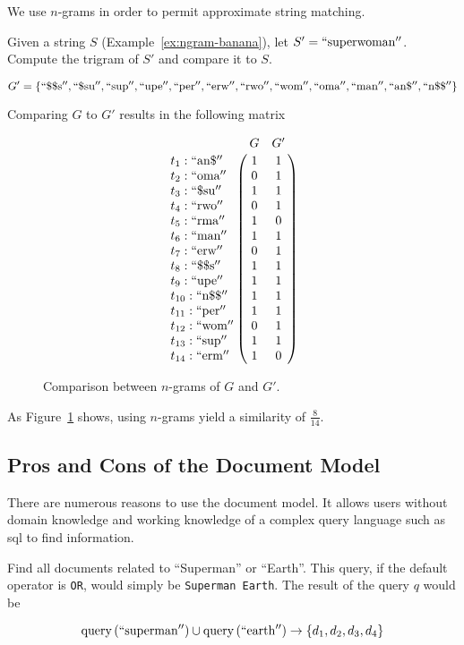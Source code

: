 		We use $n$-grams in order to permit approximate string matching.
		
		\begin{ex}
		\label{ex:n-gram-comparison}
			Given a string $S$ (Example~\ref{ex:ngram-banana}), let $S' = \mathrm{``superwoman''}$.  Compute the trigram of $S'$ and compare it to $S$.
			
			$$
				G' = \left\{
					\mathrm{``\char"24\char"24s''},
					\mathrm{``\char"24su''},
					\mathrm{``sup''},
					\mathrm{``upe''},
					\mathrm{``per''},
					\mathrm{``erw''},
					\mathrm{``rwo''},
					\mathrm{``wom''},
					\mathrm{``oma''},
					\mathrm{``man''},
					\mathrm{``an\char"24''},
					\mathrm{``n\char"24\char"24''}
				\right\}
			$$
			
			Comparing $G$ to $G'$ results in the following matrix
			
			\begin{figure}[!ht]
				$$
					\bordermatrix{
						~ & G & G' \cr
						t_1 : \mathrm{``an\char"24''} & 1 & 1 \cr
						t_2 : \mathrm{``oma''} & 0 & 1 \cr
						t_3 : \mathrm{``\char"24su''} & 1 & 1 \cr
						t_4 : \mathrm{``rwo''} & 0 & 1 \cr
						t_5 : \mathrm{``rma''} & 1 & 0 \cr
						t_6 : \mathrm{``man''} & 1 & 1 \cr
						t_7 : \mathrm{``erw''} & 0 & 1 \cr
						t_8 : \mathrm{``\char"24\char"24s''} & 1 & 1 \cr
						t_9 : \mathrm{``upe''} & 1 & 1 \cr
						t_{10} : \mathrm{``n\char"24\char"24''} & 1 & 1 \cr
						t_{11} : \mathrm{``per''} & 1 & 1 \cr
						t_{12} : \mathrm{``wom''} & 0 & 1 \cr
						t_{13} : \mathrm{``sup''} & 1 & 1 \cr
						t_{14} : \mathrm{``erm''} & 1 & 0 \cr
					}
				$$
				
				\caption{Comparison between $n$-grams of $G$ and $G'$.}
				\label{fig:n-gram-misspelling-comparison}
			\end{figure}
			
			As Figure~\ref{fig:n-gram-misspelling-comparison} shows, using $n$-grams yield a similarity of $\frac{8}{14}$.
		\end{ex}
			
	\subsection{Pros and Cons of the Document Model}
		There are numerous reasons to use the document model.  It allows users without domain knowledge and working knowledge of a complex query language such as \gls{sql} to find information.
		
		\begin{ex}
			Find all documents related to ``Superman'' or ``Earth''.  This query, if the default operator is \texttt{OR}, would simply be \texttt{Superman Earth}.  The result of the query $q$ would be
			
			$$\operatorname{query}\left(\mathrm{``superman''}\right) \cup \operatorname{query}\left(\mathrm{``earth''}\right) \rightarrow \left\{d_1, d_2, d_3, d_4\right\}$$
		\end{ex}
		
